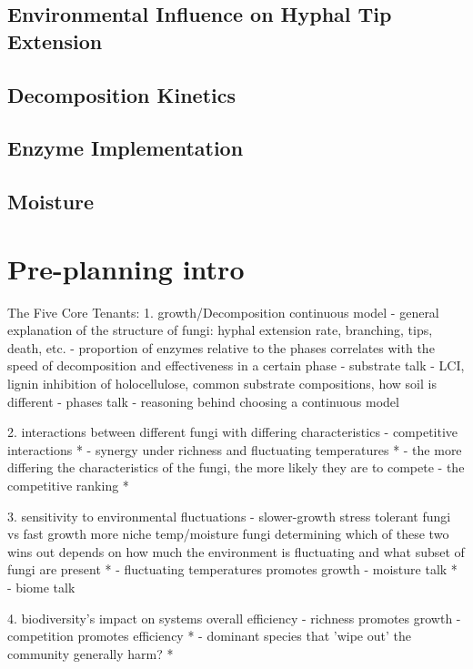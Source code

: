 \documentclass[12pt]{article}
\begin{document}
\begin{multicols}{2}
\subsection{Environmental Influence on Hyphal Tip Extension}

\subsection{Decomposition Kinetics}

\subsection{Enzyme Implementation}

\subsection{Moisture}

\section{Pre-planning intro}

The Five Core Tenants:
1. growth/Decomposition continuous model
- general explanation of the structure of fungi: hyphal extension rate, branching, tips, death, etc.
- proportion of enzymes relative to the phases correlates with the speed of decomposition and effectiveness in a certain phase
- substrate talk - LCI, lignin inhibition of holocellulose, common substrate compositions, how soil is different
- phases talk
- reasoning behind choosing a continuous model

2. interactions between different fungi with differing characteristics
- competitive interactions *
- synergy under richness and fluctuating temperatures *
- the more differing the characteristics of the fungi, the more likely they are to compete
- the competitive ranking *

3. sensitivity to environmental fluctuations
- slower-growth stress tolerant fungi vs fast growth more niche temp/moisture fungi determining which of these two wins out depends on how much the environment is fluctuating and what subset of fungi are present *
- fluctuating temperatures promotes growth
- moisture talk *
- biome talk

4. biodiversity's impact on systems overall efficiency
- richness promotes growth
- competition promotes efficiency *
- dominant species that 'wipe out' the community generally harm? *


\end{multicols}
\end{document}
